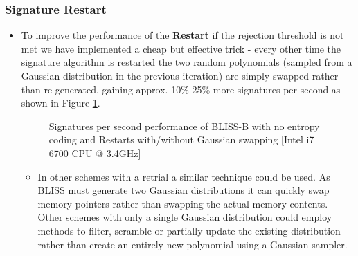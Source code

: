 \clearpage
\subsubsection{Signature Restart}
\begin{itemize}
\item To improve the performance of the \textbf{Restart} if the rejection threshold is not met we have implemented a cheap but effective trick - every other time the signature algorithm is restarted the two random polynomials (sampled from a Gaussian distribution in the previous iteration) are simply swapped rather than re-generated, gaining approx. 10\%-25\% more signatures per second as shown in Figure \ref{fig:bliss_b_gaussian_swapping}.

\pgfplotsset{compat=1.13,width=15cm,height=7cm}
\begin{figure}[ht!]
\centering
{}
\caption{Signatures per second performance of BLISS-B with no entropy coding and Restarts with/without Gaussian swapping [Intel i7 6700 CPU @ 3.4GHz]}
\label{fig:bliss_b_gaussian_swapping}
\end{figure}

\begin{itemize}
  \item In other schemes with a retrial a similar technique could be used. As BLISS must generate two Gaussian distributions it can quickly swap memory pointers rather than swapping the actual memory contents. Other schemes with only a single Gaussian distribution could employ methods to filter, scramble or partially update the existing distribution rather than create an entirely new polynomial using a Gaussian sampler.
\end{itemize}
\end{itemize}

